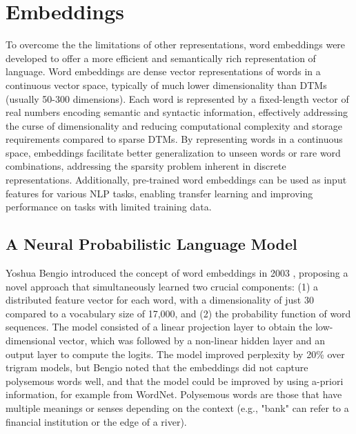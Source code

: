 \documentclass[a4paper, oneside]{discothesis}
\begin{document}
\section{Embeddings}

To overcome the the limitations of other representations, word embeddings were developed to offer a more efficient and semantically rich representation of language. Word embeddings are dense vector representations of words in a continuous vector space, typically of much lower dimensionality than DTMs (usually 50-300 dimensions). Each word is represented by a fixed-length vector of real numbers encoding semantic and syntactic information, effectively addressing the curse of dimensionality and reducing computational complexity and storage requirements compared to sparse DTMs. By representing words in a continuous space, embeddings facilitate better generalization to unseen words or rare word combinations, addressing the sparsity problem inherent in discrete representations. Additionally, pre-trained word 
embeddings can be used as input features for various NLP tasks, enabling transfer learning and improving performance on tasks with limited training data. 


\subsection{A Neural Probabilistic Language Model}
Yoshua Bengio introduced the concept of word embeddings in 2003 \cite{bengio2003neural}, proposing a novel approach that simultaneously learned two crucial components: (1) a distributed feature vector for each word, with a dimensionality of just 30 compared to a vocabulary size of 17,000, and (2) the probability function of word sequences. 
The model consisted of a linear projection layer to obtain the low-dimensional vector, which was followed by a non-linear hidden layer and an output layer to compute the logits. The model improved perplexity by 20\% over trigram models, but Bengio noted that the embeddings did not capture polysemous words well, and that the model could be improved by using a-priori information, for example from WordNet. Polysemous words are those that have multiple meanings or senses depending on the context (e.g., "bank" can refer to a financial institution or the edge of a river). 
\end{document}
